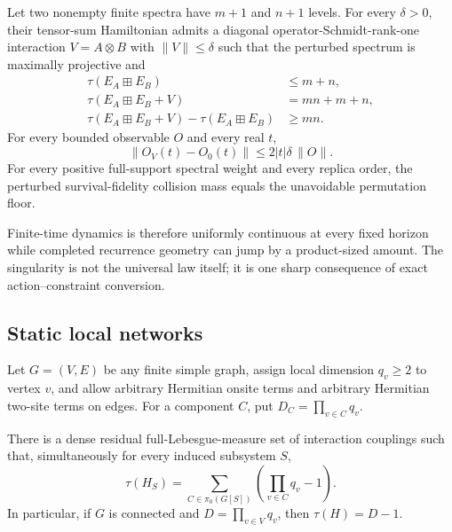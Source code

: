 \begin{theorem}
\label{thm:interaction}
Let two nonempty finite spectra have $m+1$ and $n+1$ levels.  For every
$\delta>0$, their tensor-sum Hamiltonian admits a diagonal
operator-Schmidt-rank-one interaction $V=A\otimes B$ with
$\|V\|\le\delta$ such that the perturbed spectrum is maximally projective and
\begin{align}
 \tau(E_A\boxplus E_B)&\le m+n,\\
 \tau(E_A\boxplus E_B+V)&=mn+m+n,                    \label{eq:interactionmult}\\
 \tau(E_A\boxplus E_B+V)-\tau(E_A\boxplus E_B)&\ge mn.
\end{align}
For every bounded observable $O$ and every real $t$,
\begin{equation}
 \|O_V(t)-O_0(t)\|\le2|t|\delta\,\|O\|.              \label{eq:duhamel-main}
\end{equation}
For every positive full-support spectral weight and every replica order, the
perturbed survival-fidelity collision mass equals the unavoidable
permutation floor.
\end{theorem}

Finite-time dynamics is therefore uniformly continuous at every fixed
horizon while completed recurrence geometry can jump by a product-sized
amount.  The singularity is not the universal law itself; it is one sharp
consequence of exact action--constraint conversion.

\subsection{Static local networks}

Let $G=(V,E)$ be any finite simple graph, assign local dimension $q_v\ge2$
to vertex $v$, and allow arbitrary Hermitian onsite terms and arbitrary
Hermitian two-site terms on edges.  For a component $C$, put
$D_C=\prod_{v\in C}q_v$.

\begin{theorem}
\label{thm:path}
There is a dense residual full-Lebesgue-measure set of interaction
couplings such that, simultaneously for every induced subsystem $S$,
\begin{equation}
 \boxed{\tau(H_S)=
 \sum_{C\in\pi_0(G[S])}\left(\prod_{v\in C}q_v-1\right).}
 \label{eq:graphrank-main}
\end{equation}
In particular, if $G$ is connected and
$D=\prod_{v\in V}q_v$, then $\tau(H)=D-1$.
\end{theorem}

